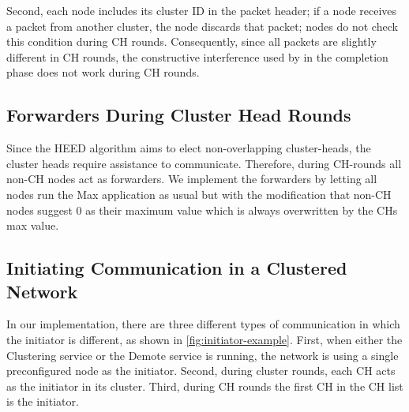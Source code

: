 Second, each node includes its cluster ID in the packet header; if a node receives a packet from another cluster, the node discards that packet; nodes do not check this condition during CH rounds. Consequently, since all packets are slightly different in CH rounds, the constructive interference used by \atwo{} in the completion phase does not work during CH rounds.

\subsection{Forwarders During Cluster Head Rounds}
Since the HEED algorithm aims to elect non-overlapping cluster-heads, the cluster heads require assistance to communicate. Therefore, during CH-rounds all non-CH nodes act as forwarders. We implement the forwarders by letting all nodes run the Max application as usual but with the modification that non-CH nodes suggest 0 as their maximum value which is always overwritten by the CHs max value.


\subsection{Initiating Communication in a Clustered Network}
\label{subsec:implementation_the-initiator}
In our implementation, there are three different types of communication in which the initiator is different, as shown in \cref{fig:initiator-example}. First, when either the Clustering service or the Demote service is running, the network is using a single preconfigured node as the initiator. Second, during cluster rounds, each CH acts as the initiator in its cluster. Third, during CH rounds the first CH in the CH list is the initiator.

